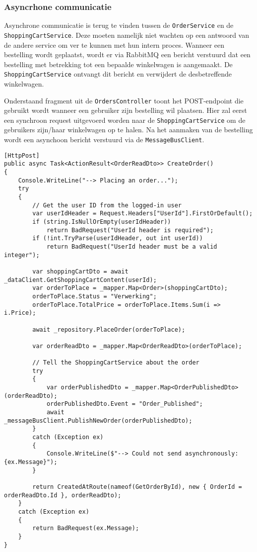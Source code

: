 \subsubsection{Asyncrhone communicatie}

Asynchrone communicatie is terug te vinden tussen de \texttt{OrderService} en de \texttt{ShoppingCartService}. Deze moeten namelijk niet wachten op een antwoord van de andere service om ver te kunnen met hun intern proces. Wanneer een bestelling wordt geplaatst, wordt er via RabbitMQ een bericht verstuurd dat een bestelling met betrekking tot een bepaalde winkelwagen is aangemaakt. De \texttt{ShoppingCartService} ontvangt dit bericht en verwijdert de desbetreffende winkelwagen.\newline

Onderstaand fragment uit de \texttt{OrdersController} toont het POST-endpoint die gebruikt wordt wanneer een gebruiker zijn bestelling wil plaatsen. Hier zal eerst een synchroon request uitgevoerd worden naar de \texttt{ShoppingCartService} om de gebruikers zijn/haar winkelwagen op te halen. Na het aanmaken van de bestelling wordt een asynchoon bericht verstuurd via de \texttt{MessageBusClient}.\medskip

\begin{lstlisting}[style=mystyleA, caption=OrdersController.cs (fragment)(Microservice), label=lst:MicroOrdersC]
[HttpPost]
public async Task<ActionResult<OrderReadDto>> CreateOrder()
{
	Console.WriteLine("--> Placing an order...");
	try
	{
		// Get the user ID from the logged-in user
		var userIdHeader = Request.Headers["UserId"].FirstOrDefault();
		if (string.IsNullOrEmpty(userIdHeader))
			return BadRequest("UserId header is required");
		if (!int.TryParse(userIdHeader, out int userId))
			return BadRequest("UserId header must be a valid integer");
		
		var shoppingCartDto = await _dataClient.GetShoppingCartContent(userId);
		var orderToPlace = _mapper.Map<Order>(shoppingCartDto);
		orderToPlace.Status = "Verwerking";
		orderToPlace.TotalPrice = orderToPlace.Items.Sum(i => i.Price);
		
		await _repository.PlaceOrder(orderToPlace);
		
		var orderReadDto = _mapper.Map<OrderReadDto>(orderToPlace);
		
		// Tell the ShoppingCartService about the order
		try
		{
			var orderPublishedDto = _mapper.Map<OrderPublishedDto>(orderReadDto);
			orderPublishedDto.Event = "Order_Published";
			await _messageBusClient.PublishNewOrder(orderPublishedDto);
		}
		catch (Exception ex)
		{
			Console.WriteLine($"--> Could not send asynchronously: {ex.Message}");
		}
		
		return CreatedAtRoute(nameof(GetOrderById), new { OrderId = orderReadDto.Id }, orderReadDto);
	}
	catch (Exception ex)
	{
		return BadRequest(ex.Message);
	}
}
\end{lstlisting}

